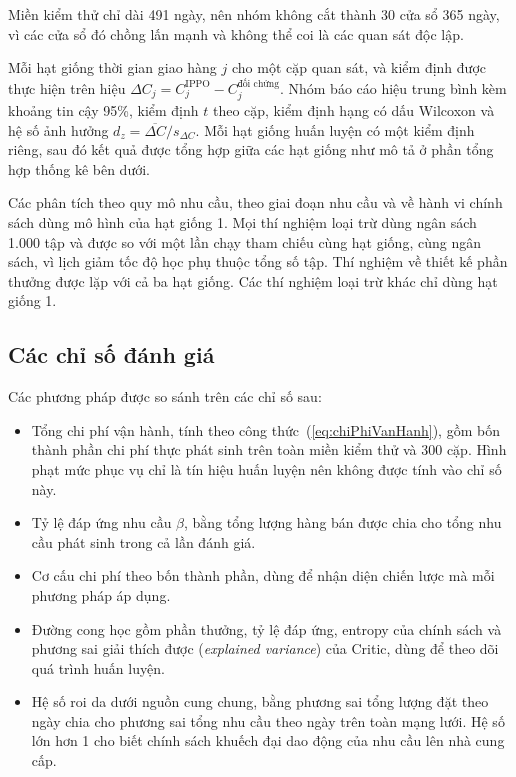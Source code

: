 Miền kiểm thử chỉ dài 491 ngày, nên nhóm không cắt thành 30 cửa sổ 365 ngày, vì các cửa sổ đó chồng lấn mạnh và không thể coi là các quan sát độc lập.

Mỗi hạt giống thời gian giao hàng $j$ cho một cặp quan sát, và kiểm định được thực hiện trên hiệu $\Delta C_j = C_j^{\text{IPPO}} - C_j^{\text{đối chứng}}$. Nhóm báo cáo hiệu trung bình kèm khoảng tin cậy 95\%, kiểm định $t$ theo cặp, kiểm định hạng có dấu Wilcoxon và hệ số ảnh hưởng $d_z = \overline{\Delta C} / s_{\Delta C}$. Mỗi hạt giống huấn luyện có một kiểm định riêng, sau đó kết quả được tổng hợp giữa các hạt giống như mô tả ở phần tổng hợp thống kê bên dưới.

Các phân tích theo quy mô nhu cầu, theo giai đoạn nhu cầu và về hành vi chính sách dùng mô hình của hạt giống 1. Mọi thí nghiệm loại trừ dùng ngân sách 1.000 tập và được so với một lần chạy tham chiếu cùng hạt giống, cùng ngân sách, vì lịch giảm tốc độ học phụ thuộc tổng số tập. Thí nghiệm về thiết kế phần thưởng được lặp với cả ba hạt giống. Các thí nghiệm loại trừ khác chỉ dùng hạt giống 1.

\subsection{Các chỉ số đánh giá}
\label{subsec:chiSo}

Các phương pháp được so sánh trên các chỉ số sau:
\begin{itemize}
    \item Tổng chi phí vận hành, tính theo công thức~(\ref{eq:chiPhiVanHanh}), gồm bốn thành phần chi phí thực phát sinh trên toàn miền kiểm thử và 300 cặp. Hình phạt mức phục vụ chỉ là tín hiệu huấn luyện nên không được tính vào chỉ số này.
    \item Tỷ lệ đáp ứng nhu cầu $\beta$, bằng tổng lượng hàng bán được chia cho tổng nhu cầu phát sinh trong cả lần đánh giá.
    \item Cơ cấu chi phí theo bốn thành phần, dùng để nhận diện chiến lược mà mỗi phương pháp áp dụng.
    \item Đường cong học gồm phần thưởng, tỷ lệ đáp ứng, entropy của chính sách và phương sai giải thích được (\textit{explained variance}) của Critic, dùng để theo dõi quá trình huấn luyện.
    \item Hệ số roi da dưới nguồn cung chung, bằng phương sai tổng lượng đặt theo ngày chia cho phương sai tổng nhu cầu theo ngày trên toàn mạng lưới. Hệ số lớn hơn 1 cho biết chính sách khuếch đại dao động của nhu cầu lên nhà cung cấp.
\end{itemize}

